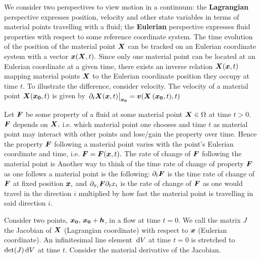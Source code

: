 We consider two perspectives to view motion in a continuum: the \textbf{Lagrangian} perspective expresses position, velocity and other state variables in terms of material points travelling with a fluid; the \textbf{Eulerian} perspective expresses fluid properties with respect to some reference coordinate system. The time evolution of the position of the material point $\boldsymbol{X}$ can be tracked on an Eulerian coordinate system with a vector $\boldsymbol{x}(\boldsymbol{X},t).$ Since only one material point can be located at an Eulerian coordinate at a given time, there exists an inverse relation $\boldsymbol{X}(\boldsymbol{x},t)$ mapping material points $\boldsymbol{X}$ to the Eulerian coordinate position they occupy at time $t.$  To illustrate the difference, consider velocity. The velocity of a material point $\boldsymbol{X}(\boldsymbol{x_0},t)$ is given by $\eval{\ppp{t}\vect{X}(\vect{x},t)}_{\vect{x_0}} = \vect{v}(\vect{X}\left(\vect{x_0},t),t\right)$

Let $\boldsymbol{F}$ be some property of a fluid at some material point $\boldsymbol{X}\in\Omega$ at time $t>0$. $\boldsymbol{F}$ depends on $\boldsymbol{X},$ i.e. which material point one chooses and time $t$ as material point may interact with other points and lose/gain the property over time. Hence the property $\boldsymbol{F}$ following a material point varies with the point's Eulerian coordinate and time, i.e. $\boldsymbol{F}=\boldsymbol{F}(\boldsymbol{x},t).$ The rate of change of $\boldsymbol{F}$ following the material point is
Another way to think of the time rate of change of property $\boldsymbol{F}$ as one follows a material point is the following: $\partial_{t}\boldsymbol{F}$ is the time rate of change of $\boldsymbol{F}$ at fixed position $\boldsymbol{x},$ and $\partial_{x_i}\boldsymbol{F}\partial_t x_i$ is the rate of change of $\boldsymbol{F}$ as one would travel in the direction $i$ multiplied by how fast the material point is travelling in said direction $i.$

Consider two points, $\boldsymbol{x_0},\,\boldsymbol{x_0}+\boldsymbol{h}$, in a flow at time $t=0$. We call the matrix $J$ the Jacobian of $\boldsymbol{X}$ (Lagrangian coordinate) with respect to $\boldsymbol{x}$ (Eulerian coordinate).
An infinitesimal line element $\,\mathrm{d} V$ at time $t=0$ is stretched to $\det(J)\,\mathrm{d} V$ at time $t$. Consider the material derivative of the Jacobian. \todo{}

